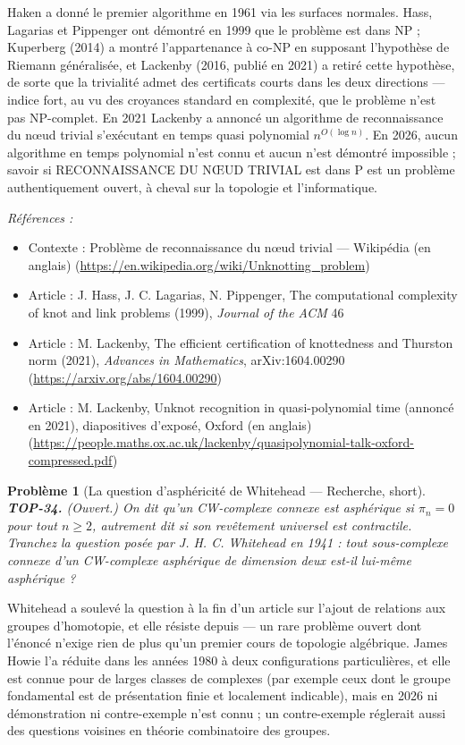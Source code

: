 \documentclass[11pt]{article}
\newtheorem{problem}{Problème}
\newenvironment{refs}{\par\small\noindent\emph{Références :}\begin{itemize}\setlength\itemsep{0pt}}{\end{itemize}\normalsize}
\begin{document}
\noindent Haken a donné le premier algorithme en 1961 via les surfaces normales. Hass, Lagarias
et Pippenger ont démontré en 1999 que le problème est dans NP ; Kuperberg (2014) a montré l'appartenance à
co-NP en supposant l'hypothèse de Riemann généralisée, et Lackenby (2016, publié en 2021) a retiré cette
hypothèse, de sorte que la trivialité admet des certificats courts dans les deux directions --- indice fort,
au vu des croyances standard en complexité, que le problème n'est pas NP-complet. En 2021 Lackenby a
annoncé un algorithme de reconnaissance du n\oe{}ud trivial s'exécutant en temps quasi polynomial
$ n^{O(\log n)} $. En 2026, aucun algorithme en temps polynomial n'est connu et aucun n'est démontré
impossible ; savoir si RECONNAISSANCE DU N\OE{}UD TRIVIAL est dans P est un problème authentiquement ouvert, à
cheval sur la topologie et l'informatique.

\begin{refs}
\item Contexte : Problème de reconnaissance du n\oe{}ud trivial --- Wikipédia (en anglais) (\url{https://en.wikipedia.org/wiki/Unknotting_problem})
\item Article : J. Hass, J. C. Lagarias, N. Pippenger, \og{} The computational complexity of knot and link problems \fg{} (1999), \textit{Journal of the ACM} 46
\item Article : M. Lackenby, \og{} The efficient certification of knottedness and Thurston norm \fg{} (2021), \textit{Advances in Mathematics}, arXiv:1604.00290 (\url{https://arxiv.org/abs/1604.00290})
\item Article : M. Lackenby, \og{} Unknot recognition in quasi-polynomial time \fg{} (annoncé en 2021), diapositives d'exposé, Oxford (en anglais) (\url{https://people.maths.ox.ac.uk/lackenby/quasipolynomial-talk-oxford-compressed.pdf})
\end{refs}

\bigskip

\begin{problem}[{La question d'asphéricité de Whitehead --- Recherche, short}]
\textbf{TOP-34.} (Ouvert.) On dit qu'un CW-complexe connexe est \textit{asphérique} si
$ \pi_n = 0 $ pour tout $ n \ge 2 $, autrement dit si son revêtement universel est contractile.
Tranchez la question posée par J. H. C. Whitehead en 1941 : tout sous-complexe connexe d'un CW-complexe
asphérique de dimension deux est-il lui-même asphérique ?
\end{problem}

\noindent Whitehead a soulevé la question à la fin d'un article sur l'ajout de relations aux
groupes d'homotopie, et elle résiste depuis --- un rare problème ouvert dont l'énoncé n'exige rien de plus
qu'un premier cours de topologie algébrique. James Howie l'a réduite dans les années 1980 à deux
configurations particulières, et elle est connue pour de larges classes de complexes (par exemple ceux dont
le groupe fondamental est de présentation finie et localement indicable), mais en 2026 ni démonstration ni
contre-exemple n'est connu ; un contre-exemple réglerait aussi des questions voisines en théorie
combinatoire des groupes.
\end{document}
